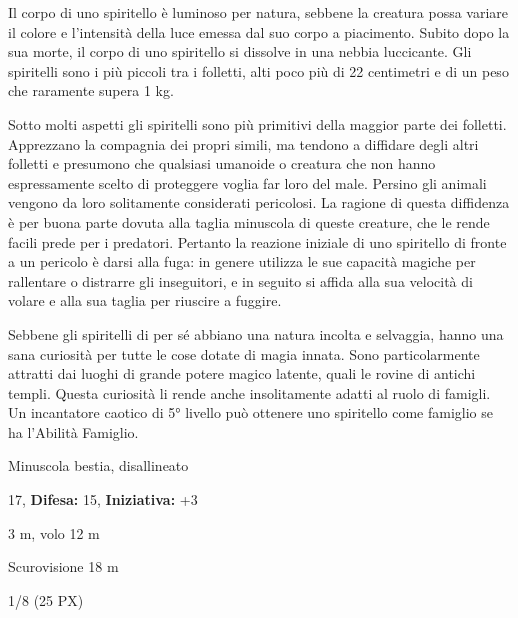 \begin{multicols}{2}
{Il corpo di uno spiritello è luminoso per natura, sebbene la creatura possa variare il colore e l'intensità della luce emessa dal suo corpo a piacimento. Subito dopo la sua morte, il corpo di uno spiritello si dissolve in una nebbia luccicante. Gli spiritelli sono i più piccoli tra i folletti, alti poco più di 22 centimetri e di un peso che raramente supera 1 kg.

Sotto molti aspetti gli spiritelli sono più primitivi della maggior parte dei folletti. Apprezzano la compagnia dei propri simili, ma tendono a diffidare degli altri folletti e presumono che qualsiasi umanoide o creatura che non hanno espressamente scelto di proteggere voglia far loro del male. Persino gli animali vengono da loro solitamente considerati pericolosi. La ragione di questa diffidenza è per buona parte dovuta alla taglia minuscola di queste creature, che le rende facili prede per i predatori. Pertanto la reazione iniziale di uno spiritello di fronte a un pericolo è darsi alla fuga: in genere utilizza le sue capacità magiche per rallentare o distrarre gli inseguitori, e in seguito si affida alla sua velocità di volare e alla sua taglia per riuscire a fuggire.

Sebbene gli spiritelli di per sé abbiano una natura incolta e selvaggia, hanno una sana curiosità per tutte le cose dotate di magia innata. Sono particolarmente attratti dai luoghi di grande potere magico latente, quali le rovine di antichi templi. Questa curiosità li rende anche insolitamente adatti al ruolo di famigli. Un incantatore caotico di 5° livello può ottenere uno spiritello come famiglio se ha l'Abilità Famiglio.

\noindent
\begin{description}[noitemsep, topsep=0pt, parsep=0pt, partopsep=0pt, leftmargin=0cm, labelwidth=2.2cm]
	\item[\textbf{Taglia/Tipo:}] Minuscola bestia, disallineato
	\item[\textbf{Caratt.:}] 
	\item[\textbf{Punti Ferita:}] 17,  \textbf{Difesa:} 15,  \textbf{Iniziativa:} +3
	\item[\textbf{Movimento:}] 3 m, volo 12 m
	\item[\textbf{Tiri Salvez.:}] 
	\item[\textbf{Sensi:}] Scurovisione 18 m
	\item[\textbf{Sfida:}] 1/8 (25 PX)\smallskip
\end{description}

}
\end{multicols}
